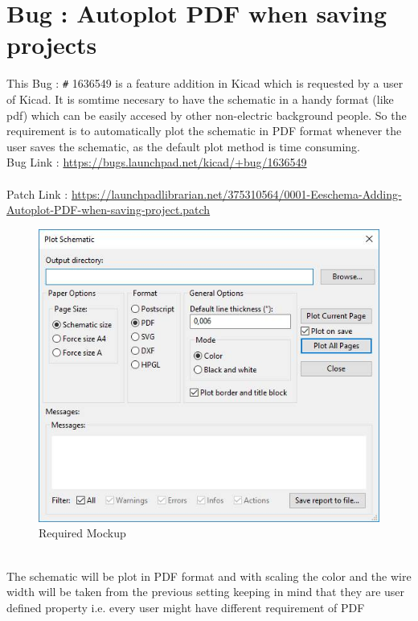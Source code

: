 \documentclass[12pt,a4paper]{report}
\begin{document}
\section{Bug : Autoplot PDF when saving projects}
This Bug : \verb!#! 1636549 is a feature addition in Kicad which is requested by a user of Kicad. It is somtime necesary to have the schematic in a handy format (like pdf) which can be easily accesed by other non-electric background people. So the requirement is to automatically plot the schematic in PDF format whenever the user saves the schematic, as the default plot method is time consuming.
\vspace{3mm}
\\
Bug Link : \url{https://bugs.launchpad.net/kicad/+bug/1636549}
\\
\\
Patch Link : \url{https://launchpadlibrarian.net/375310564/0001-Eeschema-Adding-Autoplot-PDF-when-saving-project.patch}
\begin{figure}[h]
	\centering
	\includegraphics[scale=0.4]{ki_bug_1}
	\caption{Required Mockup}
\end{figure}
\\
The schematic will be plot in PDF format and with scaling the color and the wire width will be taken from the previous setting keeping in mind that they are user defined property i.e. every user might have different requirement of PDF
\end{document}
